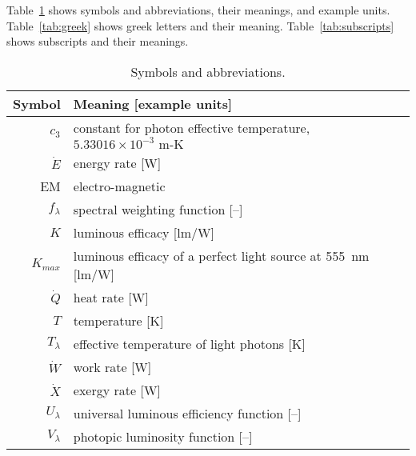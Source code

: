 
\noindent 
Table~\ref{tab:symbols} shows symbols and abbreviations, their meanings, and example units.
Table~\ref{tab:greek} shows greek letters and their meaning.
Table~\ref{tab:subscripts} shows subscripts and their meanings.


  
\begin{table}
\centering %
\caption{Symbols and abbreviations.}
\begin{tabular}{r l}
\toprule
Symbol & Meaning [example units] \\
\midrule
$c_3$ & constant for photon effective temperature, $5.33016 \times 10^{-3} \text{ m-K}$ \\
$\dot{E}$ & energy rate [W] \\
EM & electro-magnetic \\
$f_\lambda$ & spectral weighting function [--] \\
$K$ & luminous efficacy [lm/W] \\
$K_{max}$ & luminous efficacy of a perfect light source at 555~nm [lm/W] \\
$\dot{Q}$ & heat rate [W] \\
$T$ & temperature [K] \\
$T_\lambda$ & effective temperature of light photons [K] \\
$\dot{W}$ & work rate [W] \\
$\dot{X}$ & exergy rate [W] \\
$U_\lambda$ & universal luminous efficiency function [--] \\
$V_\lambda$ & photopic luminosity function [--] \\
\bottomrule
\end{tabular}
\label{tab:symbols}
\end{table}



